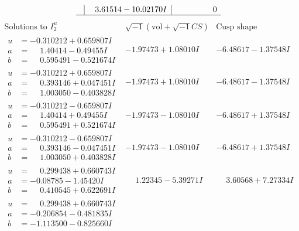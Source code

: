 \documentclass[1p]{elsarticle_modified}
\theoremstyle{definition}
\newcommand{\I}{\sqrt{-1}}
\begin{document}
$$\begin{array}{c|c|c}
 & \phantom{-}3.61514 - 10.02170 I & \phantom{-0.000000 } 0\\
 \hline 
 \end{array}$$\newpage$$\begin{array}{c|c|c}  
\text{Solutions to }I^u_{2}& \I (\text{vol} + \sqrt{-1}CS) & \text{Cusp shape}\\
 \hline 
\begin{aligned}
u &= -0.310212 + 0.659807 I \\
a &= \phantom{-}1.40414 - 0.49455 I \\
b &= \phantom{-}0.595491 - 0.521674 I\end{aligned}
 & -1.97473 + 1.08010 I & -6.48617 - 1.37548 I \\ \hline\begin{aligned}
u &= -0.310212 + 0.659807 I \\
a &= \phantom{-}0.393146 + 0.047451 I \\
b &= \phantom{-}1.003050 - 0.403828 I\end{aligned}
 & -1.97473 + 1.08010 I & -6.48617 - 1.37548 I \\ \hline\begin{aligned}
u &= -0.310212 - 0.659807 I \\
a &= \phantom{-}1.40414 + 0.49455 I \\
b &= \phantom{-}0.595491 + 0.521674 I\end{aligned}
 & -1.97473 - 1.08010 I & -6.48617 + 1.37548 I \\ \hline\begin{aligned}
u &= -0.310212 - 0.659807 I \\
a &= \phantom{-}0.393146 - 0.047451 I \\
b &= \phantom{-}1.003050 + 0.403828 I\end{aligned}
 & -1.97473 - 1.08010 I & -6.48617 + 1.37548 I \\ \hline\begin{aligned}
u &= \phantom{-}0.299438 + 0.660743 I \\
a &= -0.08785 - 1.45420 I \\
b &= \phantom{-}0.410545 + 0.622691 I\end{aligned}
 & \phantom{-}1.22345 - 5.39271 I & \phantom{-}3.60568 + 7.27334 I \\ \hline\begin{aligned}
u &= \phantom{-}0.299438 + 0.660743 I \\
a &= -0.206854 - 0.481835 I \\
b &= -1.113500 - 0.825660 I\end{aligned}

\end{array}$$
\end{document}
